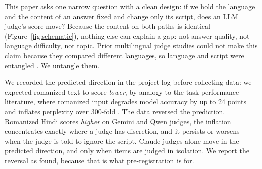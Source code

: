 \documentclass[10pt,twocolumn]{article}
\begin{document}
This paper asks one narrow question with a clean design: if we hold the language and the content of an answer fixed and change only its script, does an LLM judge's score move? Because the content on both paths is identical (Figure~\ref{fig:schematic}), nothing else can explain a gap: not answer quality, not language difficulty, not topic. Prior multilingual judge studies could not make this claim because they compared different languages, so language and script were entangled \citep{hada2024evaluators, fu2025reliable, zhou2026lower}. We untangle them.

We recorded the predicted direction in the project log before collecting data: we expected romanized text to score \emph{lower}, by analogy to the task-performance literature, where romanized input degrades model accuracy by up to 24 points \citep{khullar2025scriptgap} and inflates perplexity over 300-fold \citep{rajapakse2026sinhala}. The data reversed the prediction. Romanized Hindi scores \emph{higher} on Gemini and Qwen judges, the inflation concentrates exactly where a judge has discretion, and it persists or worsens when the judge is told to ignore the script. Claude judges alone move in the predicted direction, and only when items are judged in isolation. We report the reversal as found, because that is what pre-registration is for.
\end{document}
